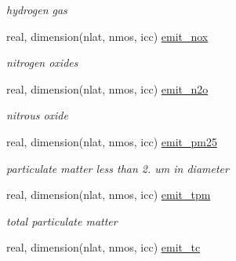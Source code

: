 \begin{DoxyCompactItemize}
\begin{DoxyCompactList}\small\item\em hydrogen gas \end{DoxyCompactList}\item 
\hypertarget{structctem__statevars_1_1veg__rot_a212b65b1b590da79a2a80f5b3e105547}{}real, dimension(nlat, nmos, icc) \hyperlink{structctem__statevars_1_1veg__rot_a212b65b1b590da79a2a80f5b3e105547}{emit\+\_\+nox}\label{structctem__statevars_1_1veg__rot_a212b65b1b590da79a2a80f5b3e105547}

\begin{DoxyCompactList}\small\item\em nitrogen oxides \end{DoxyCompactList}\item 
\hypertarget{structctem__statevars_1_1veg__rot_a0ff9e2df963933a233f26d2330cff869}{}real, dimension(nlat, nmos, icc) \hyperlink{structctem__statevars_1_1veg__rot_a0ff9e2df963933a233f26d2330cff869}{emit\+\_\+n2o}\label{structctem__statevars_1_1veg__rot_a0ff9e2df963933a233f26d2330cff869}

\begin{DoxyCompactList}\small\item\em nitrous oxide \end{DoxyCompactList}\item 
\hypertarget{structctem__statevars_1_1veg__rot_a84253fff39debeb9470ab12f7fd5859b}{}real, dimension(nlat, nmos, icc) \hyperlink{structctem__statevars_1_1veg__rot_a84253fff39debeb9470ab12f7fd5859b}{emit\+\_\+pm25}\label{structctem__statevars_1_1veg__rot_a84253fff39debeb9470ab12f7fd5859b}

\begin{DoxyCompactList}\small\item\em particulate matter less than 2. um in diameter \end{DoxyCompactList}\item 
\hypertarget{structctem__statevars_1_1veg__rot_ab2f14e22b90f16b91ed14c019b549792}{}real, dimension(nlat, nmos, icc) \hyperlink{structctem__statevars_1_1veg__rot_ab2f14e22b90f16b91ed14c019b549792}{emit\+\_\+tpm}\label{structctem__statevars_1_1veg__rot_ab2f14e22b90f16b91ed14c019b549792}

\begin{DoxyCompactList}\small\item\em total particulate matter \end{DoxyCompactList}\item 
\hypertarget{structctem__statevars_1_1veg__rot_a389bedf031025e05a2bc6956ba29fe3d}{}real, dimension(nlat, nmos, icc) \hyperlink{structctem__statevars_1_1veg__rot_a389bedf031025e05a2bc6956ba29fe3d}{emit\+\_\+tc}\label{structctem__statevars_1_1veg__rot_a389bedf031025e05a2bc6956ba29fe3d}


\end{DoxyCompactItemize}
